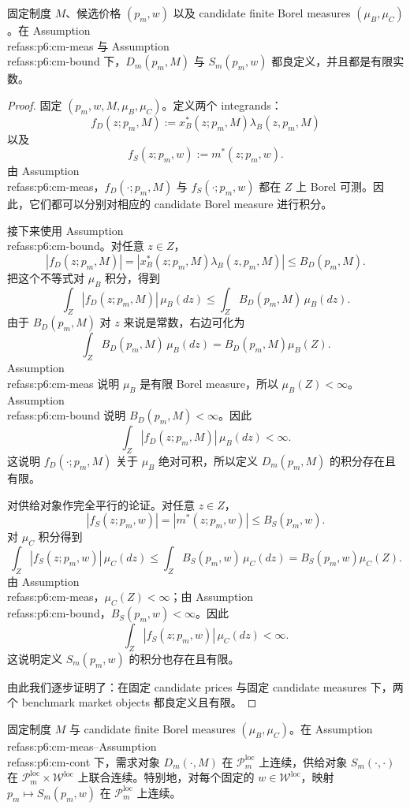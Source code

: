\begin{proposition}[良定义性与有限性]
固定制度 $M$、候选价格 $(p_m,w)$ 以及 candidate finite Borel measures $(\mu_B,\mu_C)$。在 Assumption~\\ref{ass:p6:cm-meas} 与 Assumption~\\ref{ass:p6:cm-bound} 下，$D_m(p_m,M)$ 与 $S_m(p_m,w)$ 都良定义，并且都是有限实数。
\end{proposition}

\begin{proof}
固定 $(p_m,w,M,\mu_B,\mu_C)$。定义两个 integrands：
\[
f_D(z;p_m,M):=x_B^*(z;p_m,M)\lambda_B(z,p_m,M)
\]
以及
\[
f_S(z;p_m,w):=m^*(z;p_m,w).
\]
由 Assumption~\\ref{ass:p6:cm-meas}，$f_D(\cdot;p_m,M)$ 与 $f_S(\cdot;p_m,w)$ 都在 $Z$ 上 Borel 可测。因此，它们都可以分别对相应的 candidate Borel measure 进行积分。

接下来使用 Assumption~\\ref{ass:p6:cm-bound}。对任意 $z\in Z$，
\[
|f_D(z;p_m,M)|=\left|x_B^*(z;p_m,M)\lambda_B(z,p_m,M)\right|\le B_D(p_m,M).
\]
把这个不等式对 $\mu_B$ 积分，得到
\[
\int_Z |f_D(z;p_m,M)|\,\mu_B(dz)
\le
\int_Z B_D(p_m,M)\,\mu_B(dz).
\]
由于 $B_D(p_m,M)$ 对 $z$ 来说是常数，右边可化为
\[
\int_Z B_D(p_m,M)\,\mu_B(dz)
=
B_D(p_m,M)\mu_B(Z).
\]
Assumption~\\ref{ass:p6:cm-meas} 说明 $\mu_B$ 是有限 Borel measure，所以 $\mu_B(Z)<\infty$。Assumption~\\ref{ass:p6:cm-bound} 说明 $B_D(p_m,M)<\infty$。因此
\[
\int_Z |f_D(z;p_m,M)|\,\mu_B(dz)<\infty.
\]
这说明 $f_D(\cdot;p_m,M)$ 关于 $\mu_B$ 绝对可积，所以定义 $D_m(p_m,M)$ 的积分存在且有限。

对供给对象作完全平行的论证。对任意 $z\in Z$，
\[
|f_S(z;p_m,w)|=|m^*(z;p_m,w)|\le B_S(p_m,w).
\]
对 $\mu_C$ 积分得到
\[
\int_Z |f_S(z;p_m,w)|\,\mu_C(dz)
\le
\int_Z B_S(p_m,w)\,\mu_C(dz)
=
B_S(p_m,w)\mu_C(Z).
\]
由 Assumption~\\ref{ass:p6:cm-meas}，$\mu_C(Z)<\infty$；由 Assumption~\\ref{ass:p6:cm-bound}，$B_S(p_m,w)<\infty$。因此
\[
\int_Z |f_S(z;p_m,w)|\,\mu_C(dz)<\infty.
\]
这说明定义 $S_m(p_m,w)$ 的积分也存在且有限。

由此我们逐步证明了：在固定 candidate prices 与固定 candidate measures 下，两个 benchmark market objects 都良定义且有限。
\end{proof}

\begin{proposition}[紧局部价格域上的连续性]
固定制度 $M$ 与 candidate finite Borel measures $(\mu_B,\mu_C)$。在 Assumption~\\ref{ass:p6:cm-meas}--Assumption~\\ref{ass:p6:cm-cont} 下，需求对象 $D_m(\cdot,M)$ 在 $\mathcal P_m^{\mathrm{loc}}$ 上连续，供给对象 $S_m(\cdot,\cdot)$ 在 $\mathcal P_m^{\mathrm{loc}}\times\mathcal W^{\mathrm{loc}}$ 上联合连续。特别地，对每个固定的 $w\in\mathcal W^{\mathrm{loc}}$，映射 $p_m\mapsto S_m(p_m,w)$ 在 $\mathcal P_m^{\mathrm{loc}}$ 上连续。
\end{proposition}

